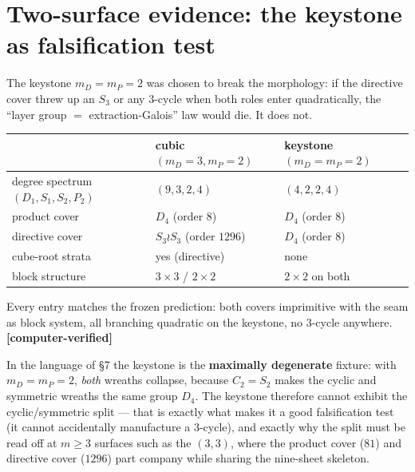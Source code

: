 \documentclass[11pt]{article}
\theoremstyle{plain}
\theoremstyle{definition}
\theoremstyle{remark}
\begin{document}
\hypertarget{two-surface-evidence-the-keystone-as-falsification-test}{%
\section{Two-surface evidence: the keystone as falsification test}\label{two-surface-evidence-the-keystone-as-falsification-test}}

The keystone \(m_D = m_P = 2\) was chosen to break the morphology: if the directive cover threw up an \(S_3\) or any \(3\)-cycle when both roles enter quadratically, the ``layer group \(=\) extraction-Galois'' law would die. It does not.

\begin{longtable}[]{@{}lll@{}}
\toprule\noalign{}
& cubic \((m_D{=}3,m_P{=}2)\) & keystone \((m_D{=}m_P{=}2)\) \\
\midrule\noalign{}
\endhead
\bottomrule\noalign{}
\endlastfoot
degree spectrum \((D_1,S_1,S_2,P_2)\) & \((9,3,2,4)\) & \((4,2,2,4)\) \\
product cover & \(D_4\) (order \(8\)) & \(D_4\) (order \(8\)) \\
directive cover & \(S_3\wr S_3\) (order \(1296\)) & \(D_4\) (order \(8\)) \\
cube-root strata & yes (directive) & none \\
block structure & \(3{\times}3\) / \(2{\times}2\) & \(2{\times}2\) on both \\
\end{longtable}

Every entry matches the frozen prediction: both covers imprimitive with the seam as block system, all branching quadratic on the keystone, no \(3\)-cycle anywhere. \textbf{{[}computer-verified{]}}

In the language of §7 the keystone is the \textbf{maximally degenerate} fixture: with \(m_D = m_P = 2\), \emph{both} wreaths collapse, because \(C_2 = S_2\) makes the cyclic and symmetric wreaths the same group \(D_4\). The keystone therefore cannot exhibit the cyclic/symmetric split --- that is exactly what makes it a good falsification test (it cannot accidentally manufacture a \(3\)-cycle), and exactly why the split must be read off at \(m \ge 3\) surfaces such as the \((3,3)\), where the product cover (\(81\)) and directive cover (\(1296\)) part company while sharing the nine-sheet skeleton.
\end{document}
